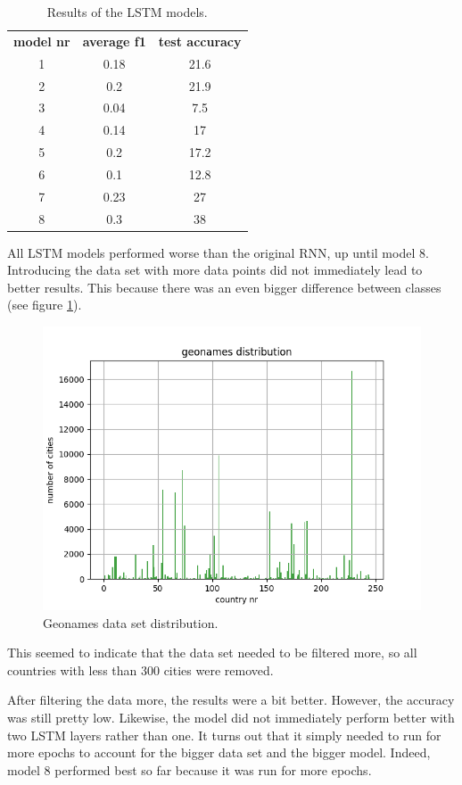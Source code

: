\documentclass[runningheads]{llncs}
\begin{document}
\begin{table}[h!]
    \begin{center}
        \caption{Results of the LSTM models.}
        \label{tab:LSTM_models}
        \begin{tabularx}{.5\textwidth}{ | c | c | c |}
			\textbf{model nr} & \textbf{average f1} & \textbf{test accuracy} \\
			1 & 0.18 & 21.6 \\
			2 & 0.2  & 21.9 \\
			3 & 0.04 & 7.5 \\
			4 & 0.14 & 17 \\
			5 & 0.2  & 17.2 \\
			6 & 0.1  & 12.8 \\
			7 & 0.23 & 27 \\
			8 & 0.3  & 38 \\
         \end{tabularx}  
    \end{center}
\end{table}

       
All LSTM models performed worse than the original RNN, up until model 8. Introducing the data set with more data points did not immediately lead to better results. This because there was an even bigger difference between classes (see figure \ref{fig:geonames}). 

\begin{figure}[h!]
	\centering
	\includegraphics[width=.5\linewidth]{plots/geonames_set.png}
	\caption{ Geonames data set distribution.}
	\label{fig:geonames}
\end{figure}

This seemed to indicate that the data set needed to be filtered more, so all countries with less than 300 cities were removed.

After filtering the data more, the results were a bit better. However, the accuracy was still pretty low. Likewise, the model did not immediately perform better with two LSTM layers rather than one. It turns out that it simply needed to run for more epochs to account for the bigger data set and the bigger model. Indeed, model 8 performed best so far because it was run for more epochs.
 
\end{document}
